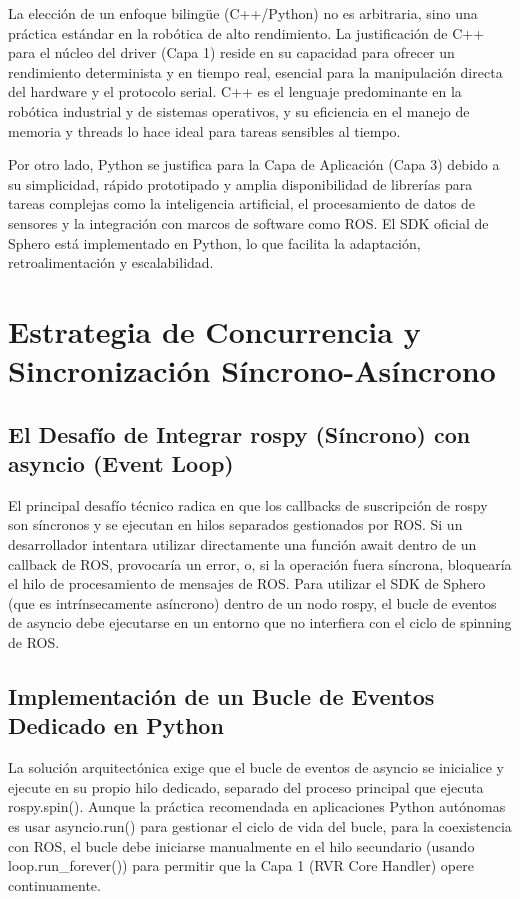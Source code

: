 \documentclass[11pt]{article}
\newcommand{\code}[1]{\textcolor{codeblue}{\url{#1}}}
\numberwithin{figure}{section}
\numberwithin{table}{section}
\def\code#1{#1}%
\begin{document}
La elección de un enfoque bilingüe (C++/Python) no es arbitraria, sino una práctica estándar en la robótica de alto rendimiento. La justificación de C++ para el núcleo del driver (Capa 1) reside en su capacidad para ofrecer un rendimiento determinista y en tiempo real, esencial para la manipulación directa del hardware y el protocolo serial. C++ es el lenguaje predominante en la robótica industrial y de sistemas operativos, y su eficiencia en el manejo de memoria y threads lo hace ideal para tareas sensibles al tiempo.

Por otro lado, Python se justifica para la Capa de Aplicación (Capa 3) debido a su simplicidad, rápido prototipado y amplia disponibilidad de librerías para tareas complejas como la inteligencia artificial, el procesamiento de datos de sensores y la integración con marcos de software como ROS. El SDK oficial de Sphero está implementado en Python, lo que facilita la adaptación, retroalimentación y escalabilidad.


\newpage


\section{Estrategia de Concurrencia y Sincronización Síncrono-Asíncrono}


\subsection{El Desafío de Integrar rospy (Síncrono) con asyncio (Event Loop)}

El principal desafío técnico radica en que los callbacks de suscripción de rospy son síncronos y se ejecutan en hilos separados gestionados por ROS. Si un desarrollador intentara utilizar directamente una función await dentro de un callback de ROS, provocaría un error, o, si la operación fuera síncrona, bloquearía el hilo de procesamiento de mensajes de ROS. Para utilizar el SDK de Sphero (que es intrínsecamente asíncrono) dentro de un nodo rospy, el bucle de eventos de asyncio debe ejecutarse en un entorno que no interfiera con el ciclo de spinning de ROS.


\subsection{Implementación de un Bucle de Eventos Dedicado en Python}

La solución arquitectónica exige que el bucle de eventos de asyncio se inicialice y ejecute en su propio 
hilo dedicado, separado del proceso principal que ejecuta rospy.spin(). Aunque la práctica recomendada en aplicaciones Python autónomas es usar asyncio.run() para gestionar el ciclo de vida del bucle, para la coexistencia con ROS, el bucle debe iniciarse manualmente en el hilo secundario (usando \code{loop.run\_forever()}) para permitir que la Capa 1 (RVR Core Handler) opere continuamente.
\end{document}
